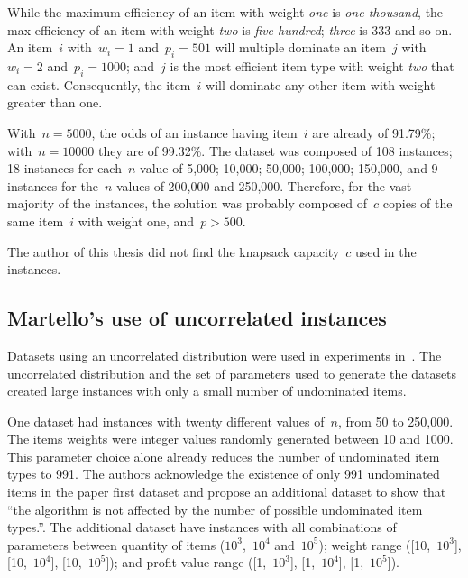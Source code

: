 While the maximum efficiency of an item with weight \emph{one} is \emph{one thousand}, the max efficiency of an item with weight \emph{two} is \emph{five hundred}; \emph{three} is 333 and so on.
An item~\(i\) with~\(w_i = 1\) and~\(p_i = 501\) will multiple dominate an item~\(j\) with~\(w_i = 2\) and~\(p_i = 1000\); and~\(j\) is the most efficient item type with weight \emph{two} that can exist.
Consequently, the item~\(i\) will dominate any other item with weight greater than one.

With~\(n = 5000\), the odds of an instance having item~\(i\) are already of 91.79\%; with~\(n = 10000\) they are of 99.32\%.
The dataset was composed of 108 instances; 18 instances for each~\(n\) value of 5,000; 10,000; 50,000; 100,000; 150,000, and 9 instances for the~\(n\) values of 200,000 and 250,000.
Therefore, for the vast majority of the instances, the solution was probably composed of~\(c\) copies of the same item~\(i\) with weight one, and~\(p > 500\).

The author of this thesis did not find the knapsack capacity~\(c\) used in the instances.

\subsection{Martello's use of uncorrelated instances}
\label{sec:martello_uncorrelated}

Datasets using an uncorrelated distribution were used in experiments in~\cite{mtu2}.
The uncorrelated distribution and the set of parameters used to generate the datasets created large instances with only a small number of undominated items.

One dataset had instances with twenty different values of~\(n\), from 50 to 250,000.
The items weights were integer values randomly generated between 10 and 1000.
This parameter choice alone already reduces the number of undominated item types to 991.
The authors acknowledge the existence of only 991 undominated items in the paper first dataset and propose an additional dataset to show that ``the algorithm is not affected by the number of possible undominated item types.''.
The additional dataset have instances with all combinations of parameters between quantity of items (\(10^3\),~\(10^4\) and~\(10^5\)); weight range ([10,~\(10^3\)], [10,~\(10^4\)], [10,~\(10^5\)]); and profit value range ([1,~\(10^3\)], [1,~\(10^4\)], [1,~\(10^5\)]).

